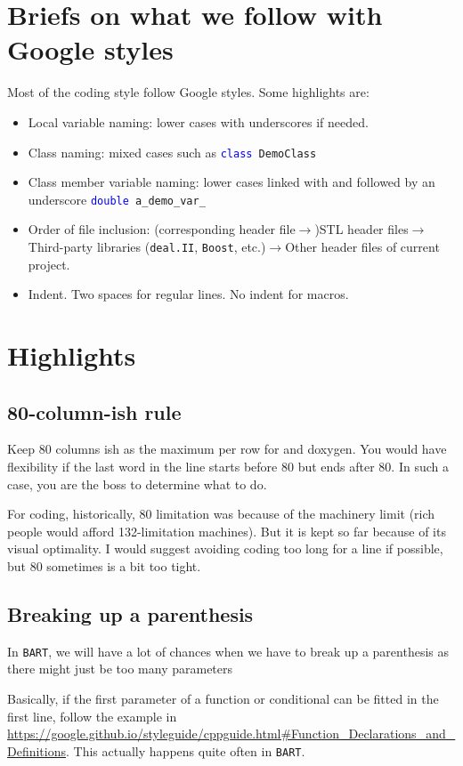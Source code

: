 \documentclass{article}
\newcommand{\bart}{{\tt BART}}
\newcommand{\blue}[1]{\textcolor{blue}{#1}}
\begin{document}
\section{Briefs on what we follow with Google styles}
Most of the coding style follow Google styles. Some highlights are:
\begin{itemize}
	\item Local variable naming: lower cases with underscores if needed.
	\item Class naming: mixed cases such as {\tt \blue{class} DemoClass}
	\item Class member variable naming: lower cases linked with and followed by an underscore {\tt \blue{double} a\_demo\_var\_}
	\item Order of file inclusion: (corresponding header file$\rightarrow$)STL header files$\rightarrow$Third-party libraries ({\tt deal.II}, {\tt Boost}, etc.)$\rightarrow$Other header files of current project.
	\item Indent. Two spaces for regular lines. No indent for macros.
\end{itemize}
\section{Highlights}
\subsection{80-column-ish rule}
Keep 80 columns ish as the maximum per row for and doxygen. You would have flexibility if the last word in the line starts before 80 but ends after 80. In such a case, you are the boss to determine what to do.

For coding, historically, 80 limitation was because of the machinery limit (rich people would afford 132-limitation machines). But it is kept so far because of its visual optimality. I would suggest avoiding coding too long for a line if possible, but 80 sometimes is a bit too tight.

\subsection{Breaking up a parenthesis}
In \bart, we will have a lot of chances when we have to break up a parenthesis as there might just be too many parameters

Basically, if the first parameter of a function or conditional can be fitted in the first line, follow the example in \url{https://google.github.io/styleguide/cppguide.html#Function_Declarations_and_Definitions}. This actually happens quite often in \bart.
\end{document}
